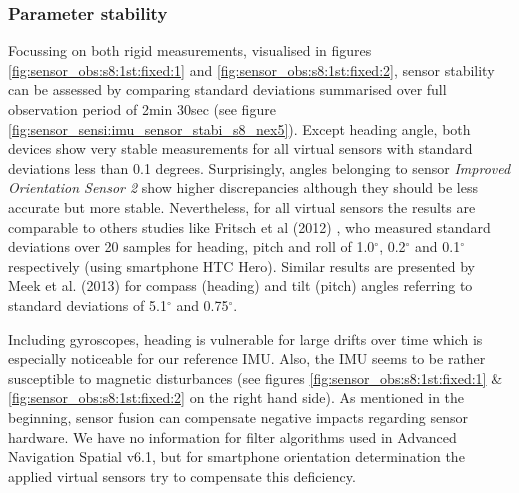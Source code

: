 \documentclass[review]{elsarticle}
\begin{document}
\subsubsection{Parameter stability}
\label{sec:technology:sensors:stability}

Focussing on both rigid measurements, visualised in figures \ref{fig:sensor_obs:s8:1st:fixed:1} and \ref{fig:sensor_obs:s8:1st:fixed:2}, sensor stability can be assessed by comparing standard deviations summarised over full observation period of 2min 30sec (see figure \ref{fig:sensor_sensi:imu_sensor_stabi_s8_nex5}). Except heading angle, both devices show very stable measurements for all virtual sensors with standard deviations less than 0.1 degrees. Surprisingly, angles belonging to sensor \textit{Improved Orientation Sensor 2} show higher discrepancies although they should be less accurate but more stable. Nevertheless, for all virtual sensors the results are comparable to others studies like Fritsch et al (2012) \cite{Fritsch2012}, who measured standard deviations over 20 samples for heading, pitch and roll of 1.0$^\circ$, 0.2$^\circ$ and 0.1$^\circ$ respectively (using smartphone HTC Hero). Similar results are presented by Meek et al. (2013) \cite{Meek2013} for compass (heading) and tilt (pitch) angles referring to standard deviations of 5.1$^\circ$ and 0.75$^\circ$.

Including gyroscopes, heading is vulnerable for large drifts over time \cite{Kok2017} which is 
especially noticeable for our reference \gls{IMU}. Also, the \gls{IMU} seems to be rather susceptible to magnetic disturbances (see figures \ref{fig:sensor_obs:s8:1st:fixed:1} \& \ref{fig:sensor_obs:s8:1st:fixed:2} on the right hand side). As mentioned in the beginning, sensor fusion can compensate negative impacts regarding sensor hardware. We have no information for filter algorithms used in Advanced Navigation Spatial v6.1, but for smartphone orientation determination the applied virtual sensors try to compensate this deficiency. 
\end{document}
